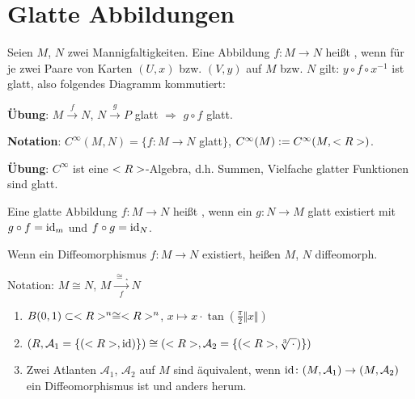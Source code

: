 \section{Glatte Abbildungen}
\begin{definition}
	Seien $M$, $N$ zwei Mannigfaltigkeiten. Eine Abbildung $f\colon M\to N$ heißt , wenn für je zwei Paare von Karten $(U,x)$ bzw. $(V,y)$ auf $M$ bzw. $N$ gilt: $y\circ f\circ x^{-1}$ ist glatt, also folgendes Diagramm kommutiert:
	\begin{center}
	\end{center}
\end{definition}

\textbf{Übung}: $M\xrightarrow{f}N$, $N\xrightarrow{g}P$ glatt $\Rightarrow$ $g\circ f$ glatt.

\textbf{Notation}: $C^\infty(M,N) = \{f\colon M\to N$ glatt$\}$, $C^\infty(M) := C^\infty (M,<R>)$.

\textbf{Übung}: $C^\infty$ ist eine $<R>$-Algebra, d.h. Summen, Vielfache glatter Funktionen sind glatt.

\begin{definition}
	Eine glatte Abbildung $f\colon M\to N$ heißt , wenn ein $g\colon N\to M$ glatt existiert mit $g\circ f =\operatorname{id}_m$ und $f\circ g = \operatorname{id}_N$.
	
	Wenn ein Diffeomorphismus $f\colon M\to N$ existiert, heißen $M$, $N$ diffeomorph.
	
	Notation: $M\cong N$, $M\xrightarrow[f]{\cong¸} N$
\end{definition}

\begin{example}
	\begin{enumerate}[label={(\arabic*)}]
		\item $B(0,1)\subset<R>^n\cong<R>^n$, $x\mapsto x\cdot\tan(\frac\pi2 \Vert x\Vert)$
		\item $(R,\mathcal A_1 = \{(<R>,\operatorname{id})\})\cong (<R>,\mathcal A_2 = \{(<R>,\sqrt[3]{\,\cdot\,})\})$
		\begin{center}
		\end{center}
		\item Zwei Atlanten $\mathcal A_1$, $\mathcal A_2$ auf $M$ sind äquivalent, wenn $\operatorname{id}\colon (M,\mathcal A_1)\to (M,\mathcal A_2)$ ein Diffeomorphismus ist und anders herum.
	\end{enumerate}
\end{example}


